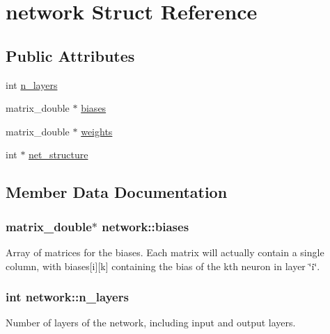 \hypertarget{structnetwork}{}\section{network Struct Reference}
\label{structnetwork}
\subsection*{Public Attributes}
\begin{DoxyCompactItemize}
\item 
int \hyperlink{structnetwork_a13ab19c09fdf154f005980abfd712b32}{n\+\_\+layers}
\item 
matrix\+\_\+double $\ast$ \hyperlink{structnetwork_a58345ad56c0c6020859c71dd4440afbc}{biases}
\item 
matrix\+\_\+double $\ast$ \hyperlink{structnetwork_aedd3f7e4b716b6f9cdd75a956f1f8af4}{weights}
\item 
int $\ast$ \hyperlink{structnetwork_a127a5087949957286cd3d7ac0b27edb4}{net\+\_\+structure}
\end{DoxyCompactItemize}


\subsection{Member Data Documentation}
\hypertarget{structnetwork_a58345ad56c0c6020859c71dd4440afbc}{}
\subsubsection[{biases}]{\setlength{\rightskip}{0pt plus 5cm}matrix\+\_\+double$\ast$ network\+::biases}\label{structnetwork_a58345ad56c0c6020859c71dd4440afbc}
Array of matrices for the biases. Each matrix will actually contain a single column, with biases\mbox{[}i\mbox{]}\mbox{[}k\mbox{]} containing the bias of the kth neuron in layer \char`\"{}i\char`\"{}. \hypertarget{structnetwork_a13ab19c09fdf154f005980abfd712b32}{}
\subsubsection[{n\+\_\+layers}]{\setlength{\rightskip}{0pt plus 5cm}int network\+::n\+\_\+layers}\label{structnetwork_a13ab19c09fdf154f005980abfd712b32}
Number of layers of the network, including input and output layers. \hypertarget{structnetwork_a127a5087949957286cd3d7ac0b27edb4}{}
